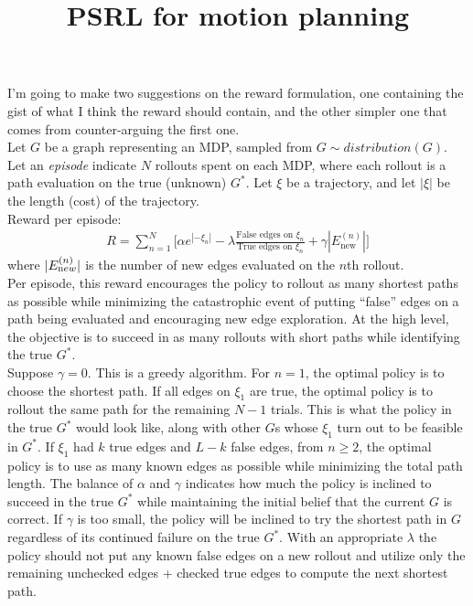 \documentclass[10pt]{article}
\title{PSRL for motion planning}
\date{}
\begin{document}
\maketitle 

\noindent I'm going to make two suggestions on the reward formulation, one containing the gist of what I think the reward should contain, and the other simpler one that comes from counter-arguing the first one. \\


\noindent Let $G$ be a graph representing an MDP, sampled from $G \sim distribution(G)$. Let an {\it episode} indicate $N$ rollouts spent on each MDP, where each rollout is a path evaluation on the true (unknown) $G^*$. Let $\xi$ be a trajectory, and let $|\xi|$ be the length (cost) of the trajectory.\\ 

\noindent Reward per episode:
\begin{align*}
R = \sum_{n=1}^N \bigg[\alpha e^{|-\xi_n|} - \lambda \frac{\text {False edges on $\xi_n$}}{\text{True edges on $\xi_n$}} + \gamma |E_\text{new}^{(n)}|\bigg]
\end{align*}
where $|E_{\text new}^{(n)}|$ is the number of new edges evaluated on the $n$th rollout.\\


\noindent Per episode, this reward encourages the policy to rollout as many shortest paths as possible while minimizing the catastrophic event of putting ``false'' edges on a path being evaluated and encouraging new edge exploration. At the high level, the objective is to succeed in as many rollouts with short paths while identifying the true $G^*$. \\


\noindent Suppose $\gamma=0$. This is a greedy algorithm. For $n=1$, the optimal policy is to choose the shortest path. If all edges on $\xi_1$ are true, the optimal policy is to rollout the same path for the remaining $N-1$ trials. This is what the policy in the true $G^*$ would look like, along with other $G$s whose $\xi_1$ turn out to be feasible in $G^*$.  If $\xi_1$ had $k$ true edges and $L - k$ false edges, from $n\geq 2$, the optimal policy is to use as many known edges as possible while minimizing the total path length. The balance of $\alpha$ and $\gamma$ indicates how much the policy is inclined to succeed in the true $G^*$ while maintaining the initial belief that the current $G$ is correct. If $\gamma$ is too small, the policy will be inclined to try the shortest path in $G$ regardless of its continued failure on the true $G^*$. With an appropriate $\lambda$ the policy should not put any known false edges on a new rollout and utilize only the remaining unchecked edges + checked true edges to compute the next shortest path.\\
\end{document}
